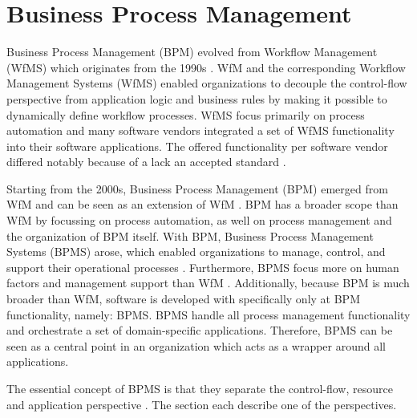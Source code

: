 



\section{Business Process Management}
Business Process Management (BPM) evolved from Workflow Management (WfMS) which originates from the 1990s \cite{hofstede2009modern,aalst2016business}. WfM and the corresponding Workflow Management Systems (WfMS) enabled organizations to decouple the control-flow perspective from application logic and business rules by making it possible to dynamically define workflow processes. WfMS focus primarily on process automation and many software vendors integrated a set of WfMS functionality into their software applications. The offered functionality per software vendor differed notably because of a lack an accepted standard \cite{dumas2013fundamentals, hofstede2009modern}.

Starting from the 2000s, Business Process Management (BPM) emerged from WfM and can be seen as an extension of WfM \cite{dumas2013fundamentals,aalst2016business}. BPM has a broader scope than WfM by focussing on process automation, as well on process management and the organization of BPM itself. With BPM, Business Process Management Systems (BPMS) arose, which enabled organizations to manage, control, and support their operational processes \cite{dumas2013fundamentals}. Furthermore, BPMS focus more on human factors and management support than WfM \cite{hofstede2009modern}. Additionally, because BPM is much broader than WfM, software is developed with specifically only at BPM functionality, namely: BPMS. BPMS handle all process management functionality and orchestrate a set of domain-specific applications. Therefore, BPMS can be seen as a central point in an organization which acts as a wrapper around all applications. \cite{dumas2013fundamentals}

The essential concept of BPMS is that they separate the control-flow, resource and application perspective \cite{hofstede2009modern}. The section each describe one of the perspectives.  

